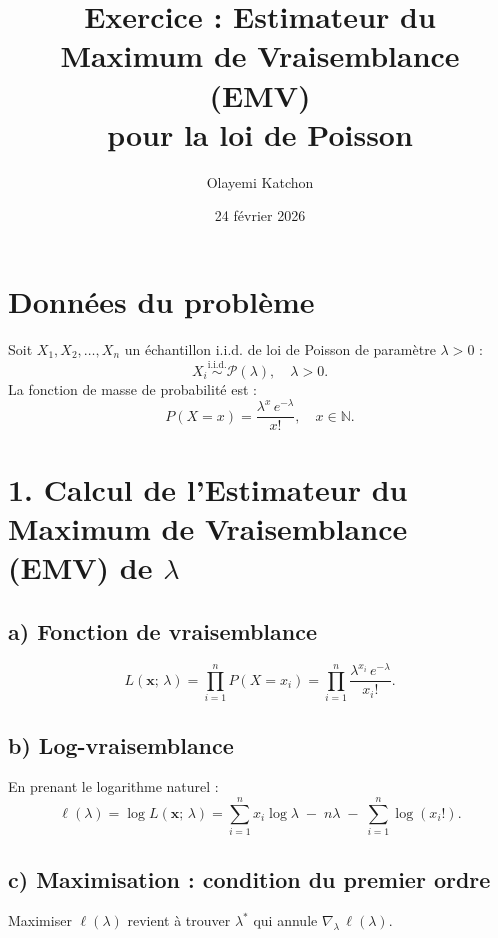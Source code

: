 \documentclass[12pt,a4paper]{article}
\title{\textbf{Exercice : Estimateur du Maximum de Vraisemblance (EMV)\\
pour la loi de Poisson}}
\author{Olayemi Katchon}
\date{24 février 2026}
\begin{document}
\maketitle

\section*{Données du problème}

Soit $X_1, X_2, \ldots, X_n$ un échantillon i.i.d. de loi de Poisson de paramètre
$\lambda > 0$ :
\[
  X_i \overset{\text{i.i.d.}}{\sim} \mathcal{P}(\lambda), \quad \lambda > 0.
\]
La fonction de masse de probabilité est :
\[
  P(X = x) = \frac{\lambda^{x}\, e^{-\lambda}}{x!}, \quad x \in \mathbb{N}.
\]

\section*{1. Calcul de l'Estimateur du Maximum de Vraisemblance (EMV) de $\lambda$}

\subsection*{a) Fonction de vraisemblance}

\[
  L(\mathbf{x};\, \lambda)
  = \prod_{i=1}^{n} P(X = x_i)
  = \prod_{i=1}^{n} \frac{\lambda^{x_i}\, e^{-\lambda}}{x_i!}.
\]

\subsection*{b) Log-vraisemblance}

En prenant le logarithme naturel :
\[
  \ell(\lambda)
  = \log L(\mathbf{x};\, \lambda)
  = \sum_{i=1}^{n} x_i \log \lambda \;-\; n\lambda \;-\; \sum_{i=1}^{n} \log(x_i!).
\]

\subsection*{c) Maximisation : condition du premier ordre}

Maximiser $\ell(\lambda)$ revient à trouver $\lambda^{*}$ qui annule
$\nabla_{\!\lambda}\,\ell(\lambda)$.
\end{document}
